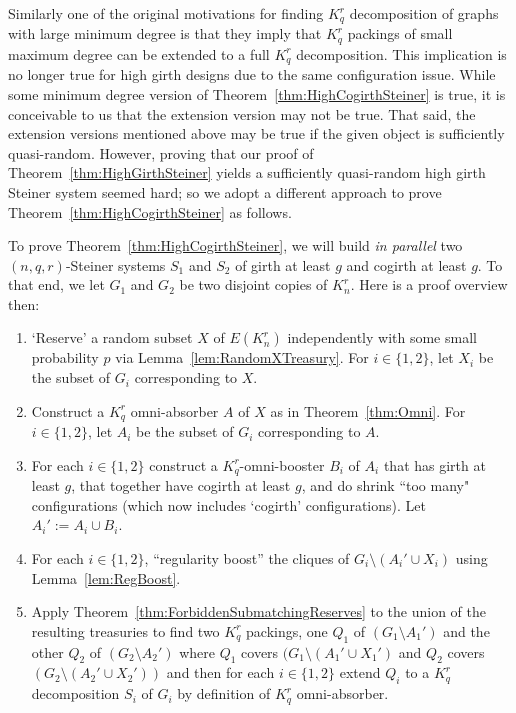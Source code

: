 \documentclass[11pt]{article}
\newcounter{i}
\theoremstyle{plain}
\theoremstyle{plain} %
\theoremstyle{definition}
\begin{document}
Similarly one of the original motivations for finding $K_q^r$ decomposition of graphs with large minimum degree is that they imply that $K_q^r$ packings of small maximum degree can be extended to a full $K_q^r$ decomposition. This implication is no longer true for high girth designs due to the same configuration issue. While some minimum degree version of Theorem~\ref{thm:HighCogirthSteiner} is true, it is conceivable to us that the extension version may not be true. That said, the extension versions mentioned above may be true if the given object is sufficiently quasi-random. However, proving that our proof of Theorem~\ref{thm:HighGirthSteiner} yields a sufficiently quasi-random high girth Steiner system seemed hard; so we adopt a different approach to prove Theorem~\ref{thm:HighCogirthSteiner} as follows.

To prove Theorem~\ref{thm:HighCogirthSteiner}, we will build \emph{in parallel} two $(n,q,r)$-Steiner systems $S_1$ and $S_2$ of girth at least $g$ and cogirth at least $g$. To that end, we let $G_1$ and $G_2$ be two disjoint copies of $K_n^r$. Here is a proof overview then:

\begin{enumerate}
    \item[(1)] `Reserve' a random subset $X$ of $E(K_n^r)$ independently with some small probability $p$ via Lemma~\ref{lem:RandomXTreasury}. For $i\in \{1,2\}$, let $X_i$ be the subset of $G_i$ corresponding to $X$. 
    \item[(2)] Construct a $K_q^r$ omni-absorber $A$ of $X$ as in Theorem~\ref{thm:Omni}. For $i\in \{1,2\}$, let $A_i$ be the subset of $G_i$ corresponding to $A$.
    \item[(2')] For each $i\in\{1,2\}$ construct a $K_q^r$-omni-booster $B_i$ of $A_i$ that has girth at least $g$, that together have cogirth at least $g$, and do shrink ``too many" configurations (which now includes `cogirth' configurations). Let $A_i' := A_i\cup B_i$.
    \item[(3)] For each $i\in \{1,2\}$, ``regularity boost'' the cliques of $G_i\setminus (A_i'\cup X_i)$ using Lemma~\ref{lem:RegBoost}.
    \item[(4)] Apply Theorem~\ref{thm:ForbiddenSubmatchingReserves} to the union of the resulting treasuries to find two $K_q^r$ packings, one $Q_1$ of $(G_1\setminus A_1')$ and the other $Q_2$ of $(G_2\setminus A_2')$ where $Q_1$ covers $(G_1\setminus (A_1'\cup X_1')$ and $Q_2$ covers $(G_2\setminus (A_2'\cup X_2'))$ and then for each $i\in\{1,2\}$ extend $Q_i$ to a $K_q^r$ decomposition $S_i$ of $G_i$ by definition of $K_q^r$ omni-absorber.  
\end{enumerate}
\end{document}
